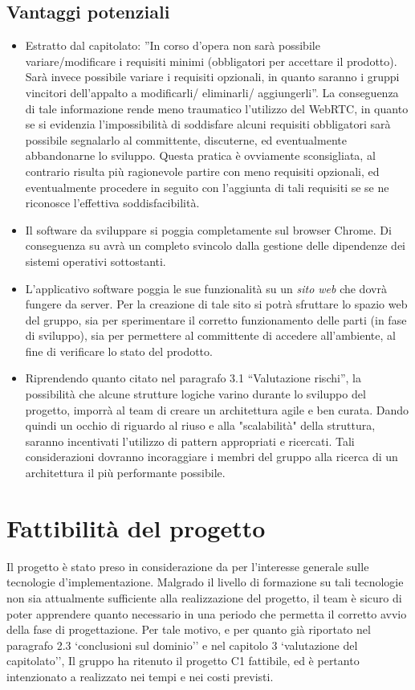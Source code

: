 \subsection{Vantaggi potenziali}
\begin{itemize}
	\item Estratto dal capitolato: ''In corso d'opera non sarà possibile variare/modificare i requisiti minimi (obbligatori per accettare il prodotto). Sarà invece possibile variare i requisiti opzionali, in quanto saranno i gruppi vincitori dell'appalto a modificarli/ eliminarli/ aggiungerli''. La conseguenza di tale informazione rende meno traumatico l'utilizzo del WebRTC, in quanto se si evidenzia l'impossibilità di soddisfare alcuni requisiti obbligatori sarà possibile segnalarlo al committente, discuterne, ed eventualmente abbandonarne lo sviluppo. Questa pratica è ovviamente sconsigliata, al contrario risulta più ragionevole partire con meno requisiti opzionali, ed eventualmente procedere in seguito con l'aggiunta di tali requisiti se se ne riconosce l'effettiva soddisfacibilità.
	\item Il software da sviluppare si poggia completamente sul browser Chrome. Di conseguenza su avrà un completo svincolo dalla gestione delle dipendenze dei sistemi operativi sottostanti.
	\item L'applicativo software poggia le sue funzionalità su un \textit{sito web} che dovrà fungere da server. Per la creazione di tale sito si potrà sfruttare lo spazio web del gruppo, sia per sperimentare il corretto funzionamento delle parti (in fase di sviluppo), sia per permettere al committente di accedere all'ambiente, al fine di verificare lo stato del prodotto.
	\item Riprendendo quanto citato nel paragrafo 3.1 ``Valutazione rischi'', la possibilità che alcune strutture logiche varino durante lo sviluppo del progetto, imporrà al team di creare un architettura agile e ben curata. Dando quindi un occhio di riguardo al riuso e alla "scalabilità" della struttura, saranno incentivati l'utilizzo di pattern appropriati e ricercati. Tali considerazioni dovranno incoraggiare i membri del gruppo alla ricerca di un architettura il più performante possibile.
\end{itemize}
\clearpage
\section{Fattibilità del progetto}
Il progetto \caName{} è stato preso in considerazione da \team{} per l'interesse generale sulle tecnologie d'implementazione. Malgrado il livello di formazione su tali tecnologie non sia attualmente sufficiente alla realizzazione del progetto, il team è sicuro di poter apprendere quanto necessario in una periodo che permetta il corretto avvio della fase di progettazione. Per tale motivo, e per quanto già riportato nel paragrafo 2.3 `conclusioni sul dominio'' e nel capitolo 3 `valutazione del capitolato'', Il gruppo \team{} ha ritenuto il progetto C1 fattibile, ed è pertanto intenzionato a realizzato nei tempi e nei costi previsti.
\clearpage

